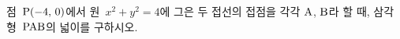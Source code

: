 점~$\mathrm{P}(-4,\,0)$에서 원~$x^2+y^2=4$에 그은 두 접선의 접점을 각각 $\mathrm{A}$, $\mathrm{B}$라 할 때, 삼각형~$\mathrm{PAB}$의 넓이를 구하시오.
